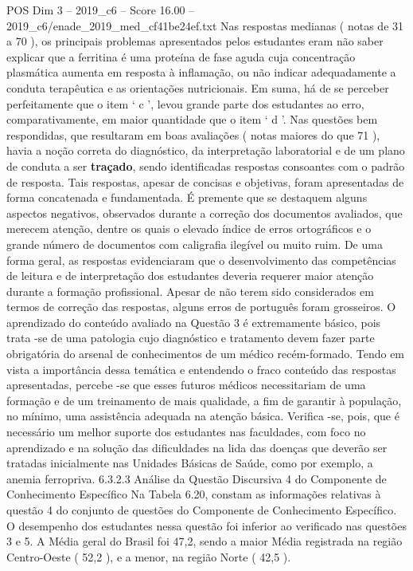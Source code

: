 \begin{textsample}{POS Dim 3 – 2019\_c6 – Score 16.00 – 2019\_c6/enade\_2019\_med\_cf41be24ef.txt}
Nas respostas medianas ( notas de 31 a 70 ), os principais problemas apresentados pelos estudantes eram não saber explicar que a ferritina é uma proteína de fase aguda cuja concentração plasmática aumenta em resposta à inflamação, ou não indicar adequadamente a conduta terapêutica e as orientações nutricionais.
Em suma, há de se perceber perfeitamente que o item ‘ c ’, levou grande parte dos estudantes ao erro, comparativamente, em maior quantidade que o item ‘ d ’.
Nas questões bem respondidas, que resultaram em boas avaliações ( notas maiores do que 71 ), havia a noção correta do diagnóstico, da interpretação laboratorial e de um plano de conduta a ser \textbf{traçado}, sendo identificadas respostas consoantes com o padrão de resposta.
Tais respostas, apesar de concisas e objetivas, foram apresentadas de forma concatenada e fundamentada.
É premente que se destaquem alguns aspectos negativos, observados durante a correção dos documentos avaliados, que merecem atenção, dentre os quais o elevado índice de erros ortográficos e o grande número de documentos com caligrafia ilegível ou muito ruim.
De uma forma geral, as respostas evidenciaram que o desenvolvimento das competências de leitura e de interpretação dos estudantes deveria requerer maior atenção durante a formação profissional.
Apesar de não terem sido considerados em termos de correção das respostas, alguns erros de português foram grosseiros.
O aprendizado do conteúdo avaliado na Questão 3 é extremamente básico, pois trata -se de uma patologia cujo diagnóstico e tratamento devem fazer parte obrigatória do arsenal de conhecimentos de um médico recém-formado.
Tendo em vista a importância dessa temática e entendendo o fraco conteúdo das respostas apresentadas, percebe -se que esses futuros médicos necessitariam de uma formação e de um treinamento de mais qualidade, a fim de garantir à população, no mínimo, uma assistência adequada na atenção básica.
Verifica -se, pois, que é necessário um melhor suporte dos estudantes nas faculdades, com foco no aprendizado e na solução das dificuldades na lida das doenças que deverão ser tratadas inicialmente nas Unidades Básicas de Saúde, como por exemplo, a anemia ferropriva. 6.3.2.3 Análise da Questão Discursiva 4 do Componente de Conhecimento Específico Na Tabela 6.20, constam as informações relativas à questão 4 do conjunto de questões do Componente de Conhecimento Específico.
O desempenho dos estudantes nessa questão foi inferior ao verificado nas questões 3 e 5.
A Média geral do Brasil foi 47,2, sendo a maior Média registrada na região Centro-Oeste ( 52,2 ), e a menor, na região Norte ( 42,5 ).

\end{textsample}

